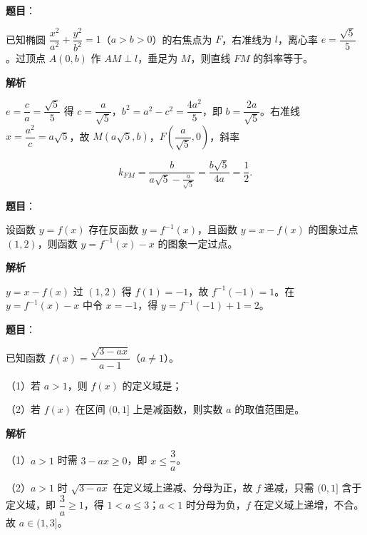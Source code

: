 \begin{answer}

\textbf{题目}：

已知椭圆 $\dfrac{x^2}{a^2}+\dfrac{y^2}{b^2}=1$（$a>b>0$）的右焦点为 $F$，右准线为 $l$，离心率 $e=\dfrac{\sqrt5}5$。过顶点 $A(0,b)$ 作 $AM\perp l$，垂足为 $M$，则直线 $FM$ 的斜率等于\gkblank{}。

\textbf{解析}

$e=\dfrac ca=\dfrac{\sqrt5}5$ 得 $c=\dfrac a{\sqrt5}$，$b^2=a^2-c^2=\dfrac{4a^2}5$，即 $b=\dfrac{2a}{\sqrt5}$。右准线 $x=\dfrac{a^2}c=a\sqrt5$，故 $M\left(a\sqrt5,b\right)$，$F\left(\dfrac a{\sqrt5},0\right)$，斜率

\nopagebreak[4]
\[k_{FM}=\frac{b}{a\sqrt5-\frac a{\sqrt5}}=\frac{b\sqrt5}{4a}=\frac12.\]


\end{answer}
\begin{answer}

\textbf{题目}：

设函数 $y=f(x)$ 存在反函数 $y=f^{-1}(x)$，且函数 $y=x-f(x)$ 的图象过点 $(1,2)$，则函数 $y=f^{-1}(x)-x$ 的图象一定过点\gkblank{}。

\textbf{解析}

$y=x-f(x)$ 过 $(1,2)$ 得 $f(1)=-1$，故 $f^{-1}(-1)=1$。在 $y=f^{-1}(x)-x$ 中令 $x=-1$，得 $y=f^{-1}(-1)+1=2$。


\end{answer}
\begin{answer}

\textbf{题目}：

已知函数 $f(x)=\dfrac{\sqrt{3-ax}}{a-1}$（$a\neq1$）。

（1）若 $a>1$，则 $f(x)$ 的定义域是\gkblank{}；

（2）若 $f(x)$ 在区间 $(0,1]$ 上是减函数，则实数 $a$ 的取值范围是\gkblank{}。

\textbf{解析}

（1）$a>1$ 时需 $3-ax\geqslant0$，即 $x\leqslant\dfrac3a$。

（2）$a>1$ 时 $\sqrt{3-ax}$ 在定义域上递减、分母为正，故 $f$ 递减，只需 $(0,1]$ 含于定义域，即 $\dfrac3a\geqslant1$，得 $1<a\leqslant3$；$a<1$ 时分母为负，$f$ 在定义域上递增，不合。故 $a\in(1,3]$。

\gkanswer{答案：$\left(-\infty,\dfrac3a\right]$；$(1,3]$。}

\end{answer}
